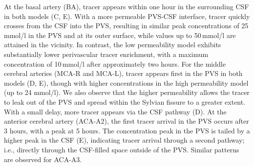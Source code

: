 \documentclass[fleqn,10pt]{wlscirep}
\begin{document}
At the basal artery (BA), tracer appears within one hour in the surrounding CSF in both models (C, E). With a more permeable PVS-CSF interface, tracer quickly crosses from the CSF into the PVS, resulting in similar peak concentrations of 25\,mmol/l in the PVS and at its outer surface, while values up to 50\,mmol/l are attained in the vicinity. In contrast, the low permeability model exhibits substantially lower perivascular tracer enrichment, with a maximum concentration of 10\,mmol/l after approximately two hours.
For the middle cerebral arteries (MCA-R and MCA-L), tracer appears
first in the PVS in both models (D, E),
though with higher concentrations in the high permeability model (up
to 24 mmol/l). We also observe that the higher permeability allows the
tracer to leak out of the PVS and spread within the Sylvian fissure to
a greater extent. With a small delay, more tracer appears via
  the CSF pathway (D). At the anterior cerebral artery (ACA-A2), the first tracer arrival in the PVS occurs after 3 hours, with a peak at 5 hours. The concentration peak in the PVS is tailed by a higher peak in the CSF (E), indicating tracer arrival through a second pathway; i.e., directly through the CSF-filled space outside of the PVS. Similar patterns are observed for ACA-A3.
\end{document}
